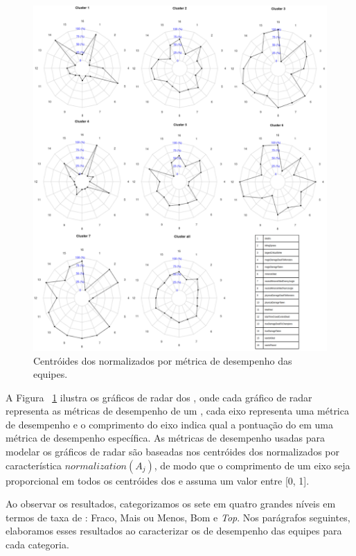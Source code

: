 \begin{figure}
\includegraphics[width=1\textwidth,height=\textheight,keepaspectratio]{radars}
\caption{Centróides dos  normalizados por métrica de desempenho das equipes.}
\label{fig:radars}
\end{figure}

A Figura ~\ref{fig:radars} ilustra os gráficos de radar dos , onde cada gráfico de radar representa as métricas de desempenho de um , cada eixo representa uma métrica de desempenho e o comprimento do eixo indica qual a pontuação do  em uma métrica de desempenho específica. As métricas de desempenho usadas para modelar os gráficos de radar são baseadas nos centróides dos  normalizados por característica $normalization(A_j)$, de modo que o comprimento de um eixo seja proporcional em todos os centróides dos  e assuma um valor entre [0, 1].


Ao observar os resultados, categorizamos os sete  em quatro grandes níveis em termos de taxa de : Fraco, Mais ou Menos, Bom e \textit{Top}. Nos parágrafos seguintes, elaboramos esses resultados ao caracterizar os  de desempenho das equipes para cada categoria.

